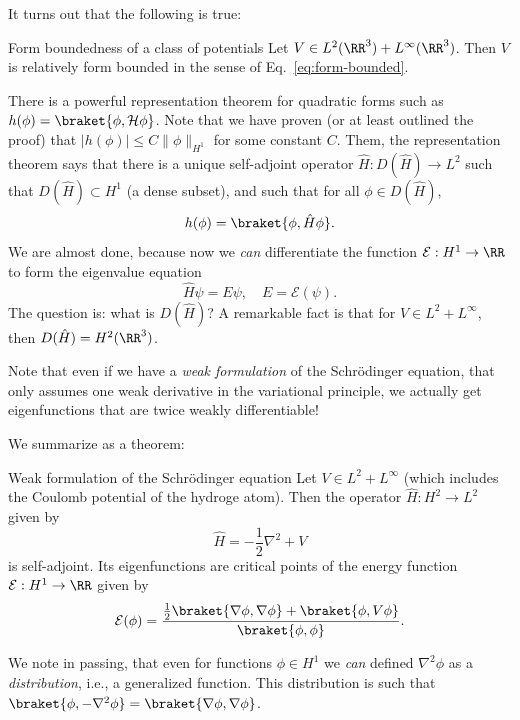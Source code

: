 It turns out that the following is true:
\begin{myLemma}{Form boundedness of a class of potentials}{}
Let $V \in L^2(\RR^3) + L^\infty(\RR^3)$. Then $V$ is relatively form bounded in the sense of Eq.~\eqref{eq:form-bounded}.
\end{myLemma}

There is a powerful representation theorem for quadratic forms such as $h(\phi) = \braket{\phi,\mathcal{H}\phi}$. Note that we have proven (or at least outlined the proof) that $|h(\phi)| \leq C \|\phi\|_{H^1}$ for some constant $C$. Them, the representation theorem says that there is a unique self-adjoint operator $\hat{H} : D(\hat{H})\to L^2$ such that $D(\hat{H})\subset H^1$ (a dense subset), and such that for all $\phi \in D(\hat{H})$,
\begin{equation}
    h(\phi) = \braket{\phi,\hat{H}\phi}.
\end{equation}
We are almost done, because now we \emph{can} differentiate the function $\mathcal{E} : H^1 \to \RR$ to form the eigenvalue equation
\begin{equation}
\hat{H}\psi = E\psi, \quad E = \mathcal{E}(\psi).
\end{equation}
The question is: what is $D(\hat{H})$? A remarkable fact is that for $V \in L^2 + L^\infty$, then $D(\hat{H}) = H^2(\RR^3)$.

Note that even if we have a \emph{weak formulation} of the Schr\"odinger equation, that only assumes one weak derivative in the variational principle, we actually get eigenfunctions that are twice weakly differentiable!

We summarize as a theorem:
\begin{myTheorem}{Weak formulation of the Schr\"odinger equation}{}
Let $V \in L^2 + L^\infty$ (which includes the Coulomb potential of the hydroge atom). Then the operator $\hat{H} : H^2\to L^2$ given by
\begin{equation}
    \hat{H} = -\frac{1}{2}\nabla^2 + V
\end{equation}
is self-adjoint. Its eigenfunctions are critical points of the energy function $\mathcal{E} : H^1 \to \RR$ given by
\begin{equation}
    \mathcal{E}(\phi) = \frac{\frac{1}{2}\braket{\nabla\phi,\nabla\phi} + \braket{\phi,V\phi}}{\braket{\phi,\phi}}.
\end{equation}
\end{myTheorem}
We note in passing, that even for functions $\phi \in H^1$ we \emph{can} defined $\nabla^2\phi$ as a \emph{distribution}, i.e., a generalized function. This distribution is such that $\braket{\phi,-\nabla^2\phi} = \braket{\nabla\phi,\nabla\phi}$.

